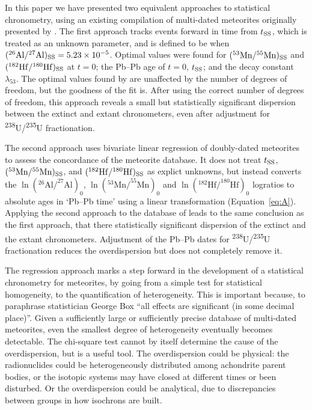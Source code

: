 In this paper we have presented two equivalent approaches to
statistical chronometry, using an existing compilation of multi-dated
meteorites originally presented by \citet{desch2023b}.  The first
approach tracks events forward in time from $\mbox{$t_{\rm SS}$}$, which is treated
as an unknown parameter, and is defined to be when $(\mbox{${}^{26}{\rm Al}/{}^{27}{\rm Al}$})_{\rm
  SS} = 5.23\times{10}^{-5}$.  Optimal values were found for
$(\mbox{${}^{53}{\rm Mn}/{}^{55}{\rm Mn}$})_{\rm SS}$ and $(\mbox{${}^{182}{\rm Hf}/{}^{180}{\rm Hf}$})_{\rm SS}$ at $t=0$; the Pb--Pb
age of $t=0$, $\mbox{$t_{\rm SS}$}$; and the decay constant $\lambda_{53}$.  The
optimal values found by \citet{desch2023b} are unaffected by the
number of degrees of freedom, but the goodness of the fit is.  After
using the correct number of degrees of freedom, this approach reveals
a small but statistically significant dispersion between the extinct
and extant chronometers, even after adjustment for
\textsuperscript{238}U/\textsuperscript{235}U fractionation.\medskip

The second approach uses bivariate linear regression of doubly-dated
meteorites to assess the concordance of the meteorite database. It
does not treat $\mbox{$t_{\rm SS}$}$, $(\mbox{${}^{53}{\rm Mn}/{}^{55}{\rm Mn}$})_{\rm SS}$, and $(\mbox{${}^{182}{\rm Hf}/{}^{180}{\rm Hf}$})_{\rm
  SS}$ as explict unknowns, but instead converts the
$\ln\left(^{26}\mbox{Al}/^{27}\mbox{Al}\right)_0$,
$\ln\left(^{53}\mbox{Mn}/^{55}\mbox{Mn}\right)_0$ and
$\ln\left(^{182}\mbox{Hf}/^{180}\mbox{Hf}\right)_0$ logratios to
absolute ages in `Pb--Pb time' using a linear transformation
(Equation~\ref{eq:A}).  Applying the second approach to the database of 
\citet{desch2023a, desch2023b} leads to the same conclusion
as the first approach, that there statistically significant dispersion
of the extinct and the extant chronometers. Adjustment of the Pb--Pb
dates for \textsuperscript{238}U/\textsuperscript{235}U fractionation
reduces the overdispersion but does not completely remove it.\medskip

The regression approach marks a step forward in the development of a
statistical chronometry for meteorites, by going from a simple test
for statistical homogeneity, to the quantification of heterogeneity.
This is important because, to paraphrase statistician George Box ``all
effects are significant (in some decimal place)''.  Given a
sufficiently large or sufficiently precise database of multi-dated
meteorites, even the smallest degree of heterogeneity eventually
becomes detectable. The chi-square test cannot by itself determine the
cause of the overdispersion, but is a useful tool.  The overdispersion
could be physical: the radionuclides could be heterogeneously
distributed among achondrite parent bodies, or the isotopic systems
may have closed at different times or been disturbed.  Or the
overdispersion could be analytical, due to discrepancies between
groups in how isochrons are built.\medskip


